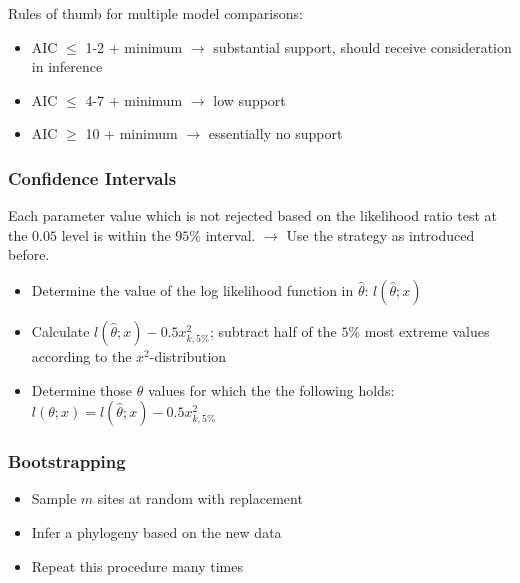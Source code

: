 \documentclass{article}
\begin{document}
\begin{multicols*}{3}
Rules of thumb for multiple model comparisons: 
\begin{itemize}
    \item AIC $\leq$ 1-2 + minimum $\rightarrow$ substantial support, should receive consideration in inference
    \item AIC $\leq$ 4-7 + minimum $\rightarrow$ low support
    \item AIC $\geq$ 10 + minimum $\rightarrow$ essentially no support
\end{itemize}

\subsubsection{Confidence Intervals}

Each parameter value which is not rejected based on the likelihood ratio test at the $0.05$ level is within the $95\%$ interval.
$\rightarrow$ Use the strategy as introduced before.
\begin{itemize}
    \item Determine the value of the log likelihood function in $\hat{\theta}$: $l(\hat{\theta};x)$
    \item Calculate $l(\hat{\theta};x) - 0.5x^2_{k,5\%}$; subtract half of the $5\%$ most extreme values according to the $x^2$-distribution
    \item Determine those $\theta$ values for which the the following holds: 
    $l(\theta;x) = l(\hat{\theta};x) - 0.5x^2_{k,5\%}$
\end{itemize}

\subsubsection{Bootstrapping}
\begin{itemize}
    \item Sample $m$ sites at random with replacement
    \item Infer a phylogeny based on the new data
    \item Repeat this procedure many times 
\end{itemize}


\end{multicols*}
\end{document}
